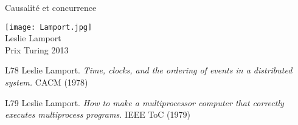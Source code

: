 
\begingroup

\begin{frame}{Causalité et concurrence}

  \vfill
  \begin{center}
    \texttt{[image: Lamport.jpg]}\\
    Leslie Lamport\\
    Prix Turing 2013
  \end{center}
  \vfill
  
  \begin{citing}
  \item[L78] Leslie Lamport. \textit{Time, clocks, and the ordering of events in a distributed system.} CACM (1978)
  \item[L79] Leslie Lamport. \textit{How to make a multiprocessor computer that correctly executes multiprocess programs.} IEEE ToC (1979)
  \end{citing}

\end{frame}

\endgroup
\endinput
